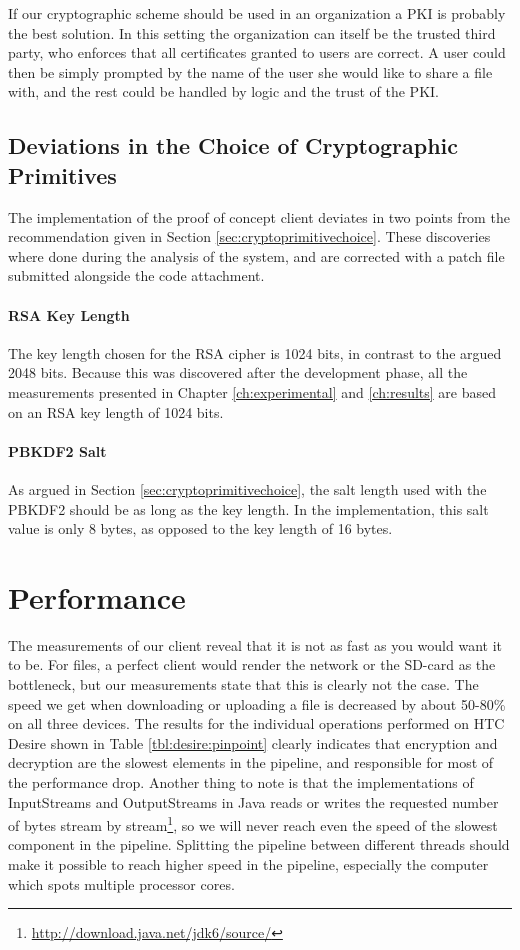 \documentclass[pdftex,english,10pt,b5paper,twoside]{book}
\begin{document}
If our cryptographic scheme should be used in an organization a \ac{PKI} is
probably the best solution. In this setting the organization can itself be the
trusted third party, who enforces that all certificates granted to users are
correct. A user could then be simply prompted by the name of the user she would
like to share a file with, and the rest could be handled by logic and the trust
of the \ac{PKI}.

\subsection{Deviations in the Choice of Cryptographic Primitives}

The implementation of the proof of concept client deviates in two points from
the recommendation given in Section \ref{sec:cryptoprimitivechoice}. 
These discoveries where done during the analysis of the system, and are
corrected with a patch file submitted alongside the code attachment.

\paragraph{RSA Key Length} The key length chosen for the RSA cipher is 1024
bits, in contrast to the argued 2048 bits. Because this was discovered after
the development phase, all the measurements presented in Chapter
\ref{ch:experimental} and \ref{ch:results} are based on an RSA key length of
1024 bits.

\paragraph{PBKDF2 Salt} As argued in Section \ref{sec:cryptoprimitivechoice},
the salt length used with the \ac{PBKDF2} should be as long as the key length.
In the implementation, this salt value is only 8 bytes, as opposed to the key
length of 16 bytes.

\section{Performance}

The measurements of our client reveal that it is not as fast as you would want
it to be. For files, a perfect client would render the network or the SD-card
as the bottleneck, but our measurements state that this is clearly not the
case. The speed we get when downloading or uploading a file is decreased by
about 50-80\% on all three devices. The results for the individual operations
performed on HTC Desire shown in Table \ref{tbl:desire:pinpoint} clearly
indicates that encryption and decryption are the slowest elements in the
pipeline, and responsible for most of the performance drop. Another thing to
note is that the implementations of InputStreams and OutputStreams in Java
reads or writes the requested number of bytes stream by
stream\footnote{\url{http://download.java.net/jdk6/source/}}, so we will never
reach even the speed of the slowest component in the pipeline. Splitting the
pipeline between different threads should make it possible to reach higher
speed in the pipeline, especially the computer which spots multiple processor
cores.
\end{document}
